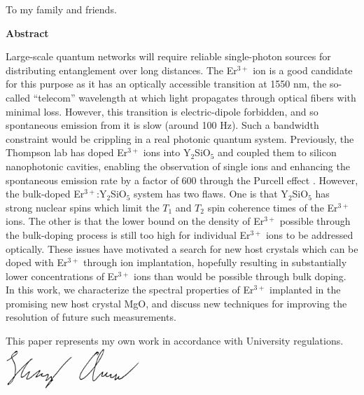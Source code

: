 \documentclass[12pt]{report}
\newcommand{\erbium}[1][ ]{Er$^{3+}$#1}
\newcommand{\YSO}[1][ ]{Y$_{2}$SiO$_{5}$#1}
\newcommand{\ErYSO}[1][ ]{Er$^{3+}$:Y$_{2}$SiO$_{5}$#1}
\begin{document}
\newpage
\thispagestyle{empty}
\vspace*{1in}
\begin{flushright}
  To my family and friends.
\end{flushright}
\clearpage
\newpage
\newpage
\thispagestyle{empty}
\onehalfspacing
\vspace*{1cm}
\begin{center}
  \textbf{Abstract}
\end{center}
  \noindent Large-scale quantum networks will require reliable single-photon sources for distributing entanglement over long distances. The \erbium ion is a good candidate for this purpose as it has an optically accessible transition at 1550 nm, the so-called ``telecom'' wavelength at which light propagates through optical fibers with minimal loss. However, this transition is electric-dipole forbidden, and so spontaneous emission from it is slow (around 100 Hz). Such a bandwidth constraint would be crippling in a real photonic quantum system. Previously, the Thompson lab has doped \erbium ions into \YSO and coupled them to silicon nanophotonic cavities, enabling the observation of single ions and enhancing the spontaneous emission rate by a factor of 600 through the Purcell effect \cite{Dibos2018}. However, the bulk-doped \ErYSO system has two flaws. One is that \YSO has strong nuclear spins which limit the  $T_{1}$ and $T_{2}$ spin coherence times of the \erbium ions. The other is that the lower bound on the density of \erbium possible through the bulk-doping process is still too high for individual \erbium ions to be addressed optically. These issues have motivated a search for new host crystals which can be doped with \erbium through ion implantation, hopefully resulting in substantially lower concentrations of \erbium ions than would be possible through bulk doping. In this work, we characterize the spectral properties of \erbium implanted in the promising new host crystal MgO, and discuss new techniques for improving the resolution of future such measurements.
  
\vspace*{\fill}
\begin{center}
  This paper represents my own work in accordance with University regulations.\\
  \includegraphics[width=2in]{Signature}
\end{center}
\vspace*{\fill}
\clearpage
\newpage
\doublespacing
\end{document}
